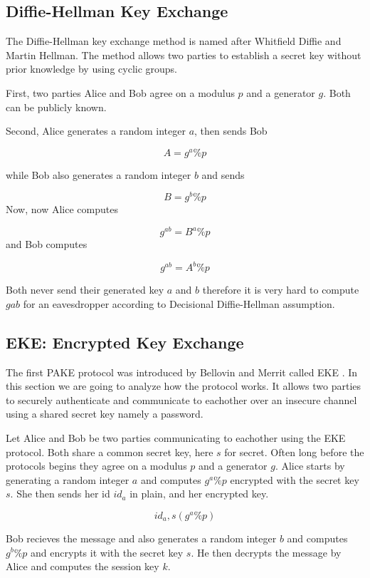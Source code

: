\documentclass[../main.tex]{subfiles}
\begin{document}
\subsection{Diffie-Hellman Key Exchange}
The Diffie-Hellman key exchange method is named after Whitfield Diffie and Martin Hellman.
The method allows two parties to establish a secret key without prior knowledge by using
cyclic groups.

First, two parties Alice and Bob agree on a modulus \(p\) and a generator
\(g\). Both can be publicly known.

Second, Alice generates a random integer \(a\), then sends Bob 

\[A = g^a \% p\]

while Bob also generates a random integer \(b\) and sends

\[B = g^b \% p\]
Now, now Alice computes

\[g^{ab} = B^a \% p\]
and Bob computes

\[g^{ab} = A^b \% p\]

Both never send their generated key \(a\) and \(b\) therefore it is very hard
to compute \(g{ab}\) for an eavesdropper according to Decisional
Diffie-Hellman assumption. 

\subsection{EKE: Encrypted Key Exchange}
The first PAKE protocol was introduced by Bellovin and Merrit called EKE
\cite{bellovin1992encrypted}. In this section we are going to analyze how the
protocol works. It allows two parties to securely authenticate and communicate
to eachother over an insecure channel using a shared secret key namely a
password.

Let Alice and Bob be two parties communicating to eachother using the EKE
protocol. Both share a common secret key, here \(s\) for secret. Often long
before the protocols begins they agree on a modulus \(p\) and a generator
\(g\). Alice starts by generating a random integer \(a\) and computes \(g^a \%
p\) encrypted with the secret key \(s\). She then sends her id \(id_a\) in
plain, and her encrypted key.

\[id_a, s(g^a \% p)\]

Bob recieves the message and also generates a random integer \(b\) and computes
\(g^b \% p\) and encrypts it with the secret key \(s\). He then decrypts the
message by Alice and computes the session key \(k\).
\end{document}
